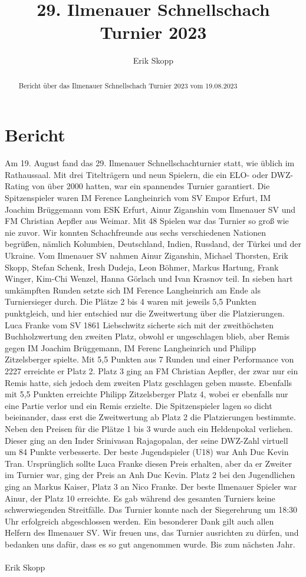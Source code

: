 \documentclass[a4paper,german]{tui-algo-seminar}
\title{29. Ilmenauer Schnellschach Turnier 2023}
\author{Erik Skopp}
\begin{document}
\maketitle

\begin{abstract}
Bericht über das Ilmenauer Schnellschach Turnier 2023 vom 19.08.2023
\end{abstract}

\section{Bericht}
Am 19. August fand das 29. Ilmenauer Schnellschachturnier statt, wie üblich im Rathaussaal. Mit drei Titelträgern und neun Spielern, die ein ELO- oder DWZ-Rating von über 2000 hatten, war ein spannendes Turnier garantiert. Die Spitzenspieler waren IM Ference Langheinrich vom SV Empor Erfurt, IM Joachim Brüggemann vom ESK Erfurt, Ainur Ziganshin vom Ilmenauer SV und FM Christian Aepfler aus Weimar. Mit 48 Spielen war das Turnier so groß wie nie zuvor. Wir konnten Schachfreunde aus sechs verschiedenen Nationen begrüßen, nämlich Kolumbien, Deutschland, Indien, Russland, der Türkei und der Ukraine. Vom Ilmenauer SV nahmen Ainur Ziganshin, Michael Thorsten, Erik Skopp, Stefan Schenk, Iresh Dudeja, Leon Böhmer, Markus Hartung, Frank Winger, Kim-Chi Wenzel, Hanna Görlach und Ivan Krasnov teil. In sieben hart umkämpften Runden setzte sich IM Ference Langheinrich am Ende als Turniersieger durch. Die Plätze 2 bis 4 waren mit jeweils 5,5 Punkten punktgleich, und hier entschied nur die Zweitwertung über die Platzierungen. Luca Franke vom SV 1861 Liebschwitz sicherte sich mit der zweithöchsten Buchholzwertung den zweiten Platz, obwohl er ungeschlagen blieb, aber Remis gegen IM Joachim Brüggemann, IM Ferenc Langheinrich und Philipp Zitzelsberger spielte. Mit 5,5 Punkten aus 7 Runden und einer Performance von 2227 erreichte er Platz 2. Platz 3 ging an FM Christian Aepfler, der zwar nur ein Remis hatte, sich jedoch dem zweiten Platz geschlagen geben musste. Ebenfalls mit 5,5 Punkten erreichte Philipp Zitzelsberger Platz 4, wobei er ebenfalls nur eine Partie verlor und ein Remis erzielte. Die Spitzenspieler lagen so dicht beieinander, dass erst die Zweitwertung ab Platz 2 die Platzierungen bestimmte. Neben den Preisen für die Plätze 1 bis 3 wurde auch ein Heldenpokal verliehen. Dieser ging an den Inder Srinivasan Rajagopalan, der seine DWZ-Zahl virtuell um 84 Punkte verbesserte. Der beste Jugendspieler (U18) war Anh Duc Kevin Tran. Ursprünglich sollte Luca Franke diesen Preis erhalten, aber da er Zweiter im Turnier war, ging der Preis an Anh Duc Kevin. Platz 2 bei den Jugendlichen ging an Markus Kaiser, Platz 3 an Nico Franke. Der beste Ilmenauer Spieler war Ainur, der Platz 10 erreichte. Es gab während des gesamten Turniers keine schwerwiegenden Streitfälle. Das Turnier konnte nach der Siegerehrung um 18:30 Uhr erfolgreich abgeschlossen werden. Ein besonderer Dank gilt auch allen Helfern des Ilmenauer SV. Wir freuen uns, das Turnier ausrichten zu dürfen, und bedanken uns dafür, dass es so gut angenommen wurde. Bis zum nächsten Jahr.\\
\\ 
Erik Skopp
\end{document}
